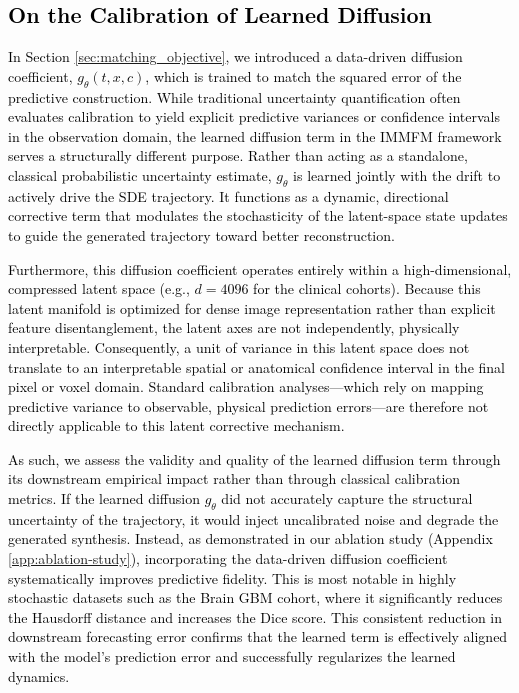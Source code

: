 \documentclass[twoside]{article}
\begin{document}
\subsection{\textcolor{black}{On the Calibration of Learned Diffusion}}
\label{app:calibration_diffusion}

\textcolor{black}{In Section \ref{sec:matching_objective}, we introduced a data-driven diffusion coefficient, $g_\theta(t,x,c)$, which is trained to match the squared error of the predictive construction. While traditional uncertainty quantification often evaluates calibration to yield explicit predictive variances or confidence intervals in the observation domain, the learned diffusion term in the IMMFM framework serves a structurally different purpose. Rather than acting as a standalone, classical probabilistic uncertainty estimate, $g_\theta$ is learned jointly with the drift to actively drive the SDE trajectory. It functions as a dynamic, directional corrective term that modulates the stochasticity of the latent-space state updates to guide the generated trajectory toward better reconstruction.}

\textcolor{black}{Furthermore, this diffusion coefficient operates entirely within a high-dimensional, compressed latent space (e.g., $d=4096$ for the clinical cohorts). Because this latent manifold is optimized for dense image representation rather than explicit feature disentanglement, the latent axes are not independently, physically interpretable. Consequently, a unit of variance in this latent space does not translate to an interpretable spatial or anatomical confidence interval in the final pixel or voxel domain. Standard calibration analyses---which rely on mapping predictive variance to observable, physical prediction errors---are therefore not directly applicable to this latent corrective mechanism.}

\textcolor{black}{As such, we assess the validity and quality of the learned diffusion term through its downstream empirical impact rather than through classical calibration metrics. If the learned diffusion $g_\theta$ did not accurately capture the structural uncertainty of the trajectory, it would inject uncalibrated noise and degrade the generated synthesis. Instead, as demonstrated in our ablation study (Appendix \ref{app:ablation-study}), incorporating the data-driven diffusion coefficient systematically improves predictive fidelity. This is most notable in highly stochastic datasets such as the Brain GBM cohort, where it significantly reduces the Hausdorff distance and increases the Dice score. This consistent reduction in downstream forecasting error confirms that the learned term is effectively aligned with the model's prediction error and successfully regularizes the learned dynamics.}
\end{document}
